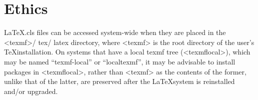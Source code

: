 		\chapter{Ethics} \label{appendix:c}




\LaTeX .cls  files can be accessed system-wide when they are placed in the
<texmf>/ tex/ latex directory, where <texmf> is the root directory of the user’s
\TeX installation.
On systems that have a local texmf tree (<texmflocal>), which
may be named ``texmf-local'' or ``localtexmf'', it may be advisable to install
packages in <texmflocal>, rather than <texmf> as the contents of the former,
unlike that of the latter, are preserved after the \LaTeX system is reinstalled
and/or upgraded.

